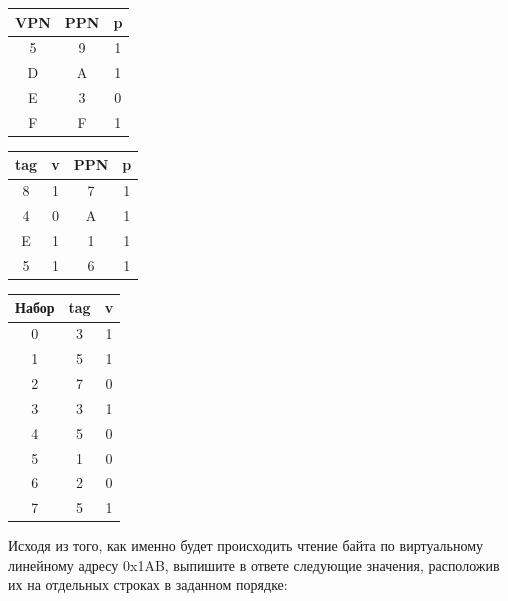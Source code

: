 \documentclass[12pt, letterpaper]{article}
\begin{document}
\begin{minipage}{.2\textwidth}
    \begin{tabular}{|c|c|c|}
        \hline
        VPN & PPN & p\\
        \hline
        5 & 9 & 1\\
        \hline
        D & A & 1\\
        \hline
        E & 3 & 0\\
        \hline
        F & F & 1\\
        \hline
    \end{tabular}
\end{minipage} 
\hspace{1cm}
\begin{minipage}{.2\textwidth}
    \begin{tabular}{|c|c|c|c|}
        \hline
        tag & v & PPN & p\\
        \hline
        8 & 1 & 7 & 1\\
        \hline
        4 & 0 & A & 1\\
        \hline
        E & 1 & 1 & 1\\
        \hline
        5 & 1 & 6 & 1\\
        \hline
    \end{tabular}
\end{minipage}  
\hspace{3cm}
\begin{minipage}{.2\textwidth}
    \begin{tabular}{|c|c|c|}
        \hline
        Набор & tag & v\\
        \hline
        0 & 3 & 1\\
        \hline
        1 & 5 & 1\\
        \hline
        2 & 7 & 0\\
        \hline
        3 & 3 & 1\\
        \hline
        4 & 5 & 0\\
        \hline
        5 & 1 & 0\\
        \hline
        6 & 2 & 0\\
        \hline
        7 & 5 & 1\\
        \hline
    \end{tabular}
\end{minipage}  
\newline

Исходя из того, как именно будет происходить чтение байта по виртуальному линейному адресу 0x1AB, выпишите в ответе следующие значения, расположив их на отдельных строках в заданном порядке:\\
\end{document}
